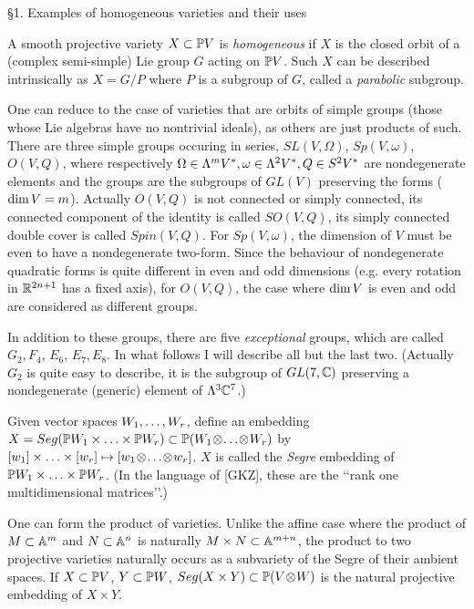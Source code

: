  

\heading \S 1. Examples of homogeneous varieties and their uses\endheading

A smooth projective variety $X\subset\Bbb P V$ is {\it homogeneous} if
$X$ is the closed orbit of a 
(complex semi-simple) Lie group $G$ acting on  $\Bbb P V$.
Such $X$ can be described intrinsically as $X=G/P$ where $P$
is a subgroup of $G$, called a {\it parabolic} subgroup.
 
 

One can reduce to the case of 
varieties that are orbits of simple groups
(those whose Lie algebras have no nontrivial ideals),
as others are just products of such. There are three
simple groups occuring in series,
$SL(V,\Omega)$, $Sp(V,\omega)$, $O(V,Q)$,
where respectively $\Omega\in \Lambda^{m} V^*,\omega\in\Lambda^{2}V^*, Q\in
S^2V^*$ are nondegenerate elements and the groups are the subgroups
of $GL(V)$ preserving the forms ($\text{dim}\, V=m$). Actually $O(V,Q)$ is not
connected or simply
connected, its connected
component of the identity is called
$SO(V,Q)$,  its simply connected double cover
is called $Spin(V,Q)$. For $Sp(V,\omega)$, the
dimension of
$V$ must be even to have a nondegenerate two-form. Since the behaviour of
nondegenerate quadratic forms is quite different in even and odd dimensions
(e.g. every rotation in $\Bbb R^{2n+1}$ has a fixed axis), 
for $O(V,Q)$, the
case where  $\text{dim}\, V$ is even and odd are   considered as different groups.

In addition to these groups, there are five {\it exceptional} groups,
which are called $G_2,F_4$,
$E_6$,
$E_7,
E_8$. In what follows I will describe
all but the last two. (Actually $G_2$ is quite easy to describe,
it is the subgroup  of $GL(7,\Bbb C)$ preserving a nondegenerate
(generic)
 element of $\Lambda^{3}\Bbb C^{7}$.)



Given vector spaces $W_1, \hdots , W_r$, define an embedding
$X=Seg(\Bbb P W_1\times\hdots\times \Bbb P W_r)\subset \Bbb P (W_1\!\otimes\!\hdots\!\otimes\!
W_r)$ by $[w_1]\times \hdots \times [w_r]
\mapsto [w_1\!\otimes\!\hdots\!\otimes\! w_r]$. $X$ is called  the {\it Segre}
embedding of 
$\Bbb P W_1\times\hdots\times \Bbb P W_r$. (In the language of [GKZ],
these are the  \lq\lq rank one multidimensional matrices\rq\rq .) 
  
 
One can form the product of varieties. Unlike
the affine case where the product of $M\subset\Bbb A^m$ and
$N\subset\Bbb A^n$ is naturally $M\times N\subset\Bbb A^{m+n}$,
the product
to two projective varieties  naturally occurs as a subvariety of 
the Segre of their ambient spaces.
If $X\subset\Bbb P V$, $Y\subset\Bbb P W$,  
$Seg(X\times Y)\subset \Bbb P (V\!\otimes\! W)$ is the natural
  projective embedding of $X\times Y$.

